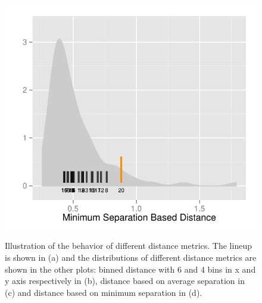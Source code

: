 \documentclass[12]{article}
\begin{document}
\begin{figure}[hbtp]
{\includegraphics[scale=0.7]{distribution-min-sep-dist-lpexp.pdf}
\label{t2comp_2}
}

	\vspace{-.1in}
\caption[Optional caption for list of figures]{Illustration of the behavior of different distance metrics. The lineup is shown in (a) and the distributions of different distance metrics are shown in the other plots:  binned distance with 6 and 4 bins in x and y axis respectively in (b), distance based on average separation in (c) and distance based on minimum separation in (d). }
\label{lp-exp}
\end{figure}
\end{document}
